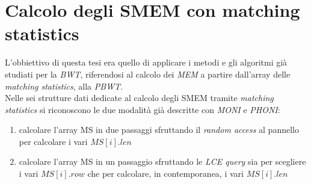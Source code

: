 \section{Calcolo degli SMEM con matching statistics}
L'obbiettivo di questa tesi era quello di applicare i metodi e gli algoritmi già
studiati per la \textit{BWT}, riferendosi al calcolo dei \textit{MEM} a partire
dall'array delle \textit{matching statistics}, alla \textit{PBWT}.\\
Nelle sei strutture dati dedicate al calcolo degli SMEM tramite \textit{matching
  statistics} si riconoscono le due modalità già descritte con \textit{MONI} e
\textit{PHONI}:
\begin{enumerate}
  \item calcolare l'array MS in due passaggi sfruttando il \textit{random
    access} al pannello per calcolare i vari $MS[i].len$
  \item calcolare l'array MS in un passaggio sfruttando le \textit{LCE query}
  sia per scegliere i vari $MS[i].row$ che per calcolare, in contemporanea, i
  vari $MS[i].len$ 
\end{enumerate}
